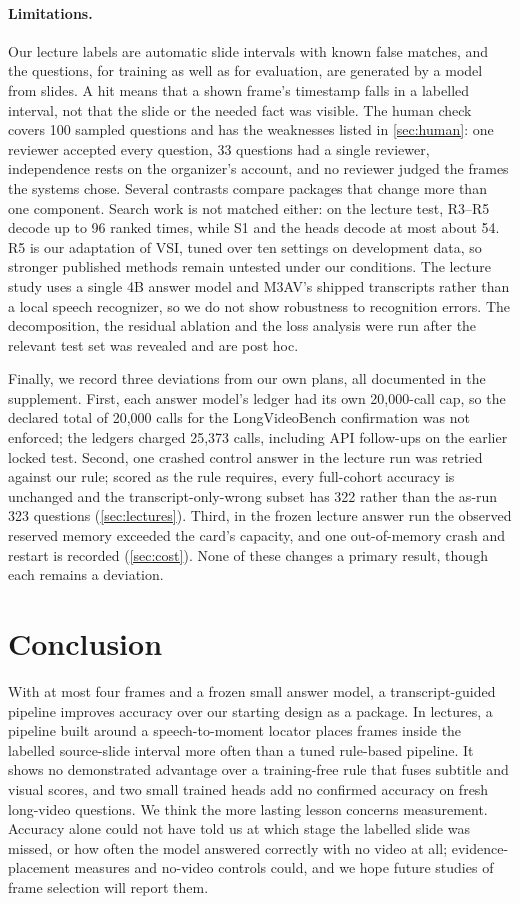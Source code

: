 \paragraph{Limitations.}
Our lecture labels are automatic slide intervals with known false matches, and the questions, for training as well as for evaluation, are generated by a model from slides.
A hit means that a shown frame's timestamp falls in a labelled interval, not that the slide or the needed fact was visible.
The human check covers 100 sampled questions and has the weaknesses listed in \cref{sec:human}: one reviewer accepted every question, 33 questions had a single reviewer, independence rests on the organizer's account, and no reviewer judged the frames the systems chose.
Several contrasts compare packages that change more than one component.
Search work is not matched either: on the lecture test, R3--R5 decode up to 96 ranked times, while S1 and the heads decode at most about 54.
R5 is our adaptation of VSI, tuned over ten settings on development data, so stronger published methods remain untested under our conditions.
The lecture study uses a single 4B answer model and M3AV's shipped transcripts rather than a local speech recognizer, so we do not show robustness to recognition errors.
The decomposition, the residual ablation and the loss analysis were run after the relevant test set was revealed and are post hoc.

Finally, we record three deviations from our own plans, all documented in the supplement.
First, each answer model's ledger had its own 20,000-call cap, so the declared total of 20,000 calls for the LongVideoBench confirmation was not enforced; the ledgers charged 25,373 calls, including API follow-ups on the earlier locked test.
Second, one crashed control answer in the lecture run was retried against our rule; scored as the rule requires, every full-cohort accuracy is unchanged and the transcript-only-wrong subset has 322 rather than the as-run 323 questions (\cref{sec:lectures}).
Third, in the frozen lecture answer run the observed reserved memory exceeded the card's capacity, and one out-of-memory crash and restart is recorded (\cref{sec:cost}).
None of these changes a primary result, though each remains a deviation.

\section{Conclusion}
\label{sec:conclusion}
With at most four frames and a frozen small answer model, a transcript-guided pipeline improves accuracy over our starting design as a package.
In lectures, a pipeline built around a speech-to-moment locator places frames inside the labelled source-slide interval more often than a tuned rule-based pipeline.
It shows no demonstrated advantage over a training-free rule that fuses subtitle and visual scores, and two small trained heads add no confirmed accuracy on fresh long-video questions.
We think the more lasting lesson concerns measurement.
Accuracy alone could not have told us at which stage the labelled slide was missed, or how often the model answered correctly with no video at all; evidence-placement measures and no-video controls could, and we hope future studies of frame selection will report them.
